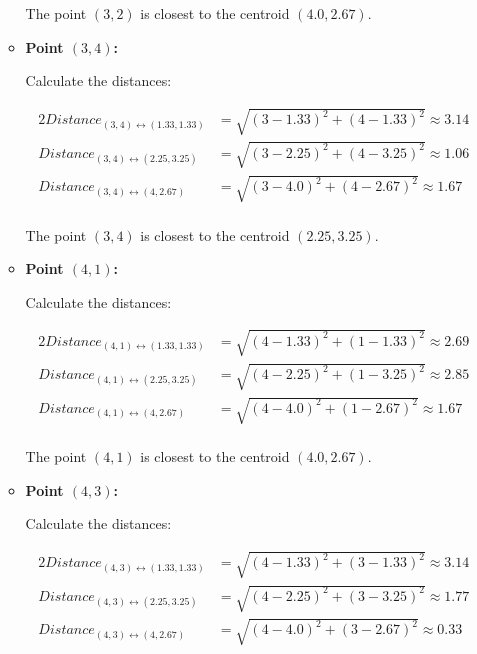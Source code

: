 \documentclass[
english,
smallborders
]{i6prcsht}
\begin{document}
\begin{solution}
\begin{enumerate}
\begin{itemize}
			            The point $(3,2)$ is closest to the centroid $(4.0,2.67)$.
			            
			      \item \textbf{Point $(3,4)$:}
			            
			            Calculate the distances:
			            
			            \begin{alignat*}{2}
				            Distance_{(3,4)\leftrightarrow(1.33,1.33)} & = \sqrt{(3-1.33)^2+(4-1.33)^2} \approx 3.14 \\
				            Distance_{(3,4)\leftrightarrow(2.25,3.25)} & = \sqrt{(3-2.25)^2+(4-3.25)^2} \approx 1.06 \\
				            Distance_{(3,4)\leftrightarrow(4,2.67)}    & = \sqrt{(3-4.0)^2+(4-2.67)^2} \approx 1.67  \\
			            \end{alignat*}
			            
			            The point $(3,4)$ is closest to the centroid $(2.25,3.25)$.
			            
			      \item \textbf{Point $(4,1)$:}
			            
			            Calculate the distances:
			            
			            \begin{alignat*}{2}
				            Distance_{(4,1)\leftrightarrow(1.33,1.33)} & = \sqrt{(4-1.33)^2+(1-1.33)^2} \approx 2.69 \\
				            Distance_{(4,1)\leftrightarrow(2.25,3.25)} & = \sqrt{(4-2.25)^2+(1-3.25)^2} \approx 2.85 \\
				            Distance_{(4,1)\leftrightarrow(4,2.67)}    & = \sqrt{(4-4.0)^2+(1-2.67)^2} \approx 1.67  \\
			            \end{alignat*}
			            
			            The point $(4,1)$ is closest to the centroid $(4.0,2.67)$.
			            
			      \item \textbf{Point $(4,3)$:}
			            
			            Calculate the distances:
			            
			            \begin{alignat*}{2}
				            Distance_{(4,3)\leftrightarrow(1.33,1.33)} & = \sqrt{(4-1.33)^2+(3-1.33)^2} \approx 3.14 \\
				            Distance_{(4,3)\leftrightarrow(2.25,3.25)} & = \sqrt{(4-2.25)^2+(3-3.25)^2} \approx 1.77 \\
				            Distance_{(4,3)\leftrightarrow(4,2.67)}    & = \sqrt{(4-4.0)^2+(3-2.67)^2} \approx 0.33  \\
			            \end{alignat*}
			            

\end{itemize}
\end{enumerate}
\end{solution}
\end{document}

